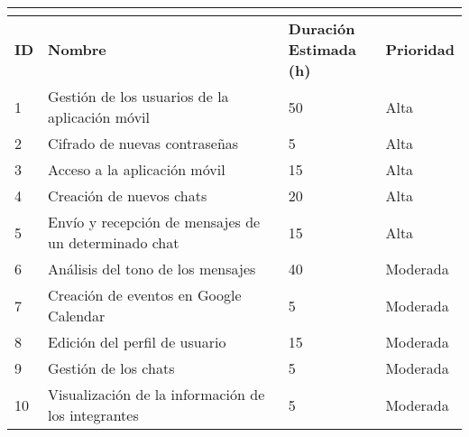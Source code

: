 \begin{tabular}{|l|l|l|l|}
	\hline
	\multicolumn{4}{|c|}{\cellcolor[HTML]{343434}{\color[HTML]{FFFFFF} \textbf{Pila de Producto}}} \\ \hline
	\textbf{ID}              & \textbf{Nombre}              & \specialcell{\textbf{Duración} \\ \textbf{Estimada (h)}}             & \textbf{Prioridad}             \\ \hline
	1               & Gestión de los usuarios de la aplicación móvil                   & 50                               & Alta                      \\ \hline
	2               & Cifrado de nuevas contraseñas                    & 5                               & Alta                      \\ \hline
	3               & Acceso a la aplicación móvil                    & 15                               & Alta                      \\ \hline
	4               & Creación de nuevos chats   & 20            & Alta                      \\ \hline
	5               & Envío y recepción de mensajes de un determinado chat                    & 15                     & Alta                      \\ \hline
	6               & Análisis del tono de los mensajes                    & 40                               & Moderada                      \\ \hline
	7               & Creación de eventos en Google Calendar                    & 5                               & Moderada                  \\ \hline
	8               & Edición del perfil de usuario                    & 15                               & Moderada                      \\ \hline
	9               & Gestión de los chats                    & 5                               & Moderada                      \\ \hline
	10               & Visualización de la información de los integrantes           & 5                & Moderada                      \\ \hline
\end{tabular}